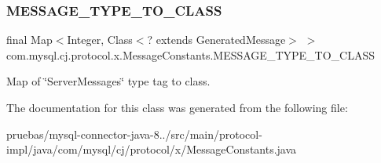 \subsubsection{\texorpdfstring{M\+E\+S\+S\+A\+G\+E\+\_\+\+T\+Y\+P\+E\+\_\+\+T\+O\+\_\+\+C\+L\+A\+SS}{MESSAGE\_TYPE\_TO\_CLASS}}
{\footnotesize\ttfamily final Map$<$Integer, Class$<$? extends Generated\+Message$>$ $>$ com.\+mysql.\+cj.\+protocol.\+x.\+Message\+Constants.\+M\+E\+S\+S\+A\+G\+E\+\_\+\+T\+Y\+P\+E\+\_\+\+T\+O\+\_\+\+C\+L\+A\+SS\hspace{0.3cm}{\ttfamily [static]}}

Map of \char`\"{}\+Server\+Messages\char`\"{} type tag to class. 

The documentation for this class was generated from the following file\+:\begin{DoxyCompactItemize}
\item 
pruebas/mysql-\/connector-\/java-\/8../src/main/protocol-\/impl/java/com/mysql/cj/protocol/x/Message\+Constants.\+java\end{DoxyCompactItemize}
